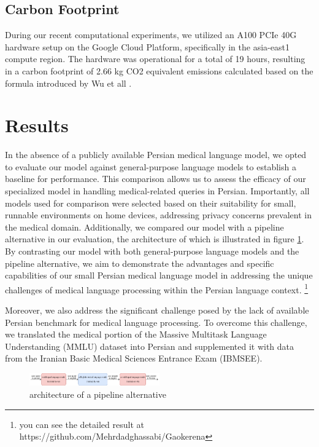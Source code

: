\documentclass[conference]{IEEEtran}
\begin{document}
\subsection{Carbon Footprint}
During our recent computational experiments, we utilized an A100 PCIe 40G hardware setup on the Google Cloud Platform, specifically in the asia-east1 compute region. The hardware was operational for a total of 19 hours, resulting in a carbon footprint of 2.66 kg CO2 equivalent emissions calculated  based on the formula introduced by Wu et all
\cite{b14}
.
\section{Results}
In the absence of a publicly available Persian medical language model, we opted to evaluate our model against general-purpose language models to establish a baseline for performance. This comparison allows us to assess the efficacy of our specialized model in handling medical-related queries in Persian. Importantly, all models used for comparison were selected based on their suitability for small, runnable environments on home devices, addressing privacy concerns prevalent in the medical domain. Additionally, we compared our model with a pipeline alternative in our evaluation, the architecture of which is illustrated in figure \ref{fig3}. By contrasting our model with both general-purpose language models and the pipeline alternative, we aim to demonstrate the advantages and specific capabilities of our small Persian medical language model in addressing the unique challenges of medical language processing within the Persian language context.
\footnote{
	you can see the detailed result at https://github.com/Mehrdadghassabi/Gaokerena
}

Moreover, we also address the significant challenge posed by the lack of available Persian benchmark for medical language processing. To overcome this challenge, we translated the medical portion of the Massive Multitask Language Understanding (MMLU) dataset \cite{b18} into Persian and supplemented it with data from the Iranian Basic Medical Sciences Entrance Exam (IBMSEE).

\begin{figure}[htbp]
	\centerline{\includegraphics[width=0.5\textwidth]{fig3.png}}
	\caption{architecture of a pipeline alternative}
	\label{fig3}
\end{figure}
\end{document}
